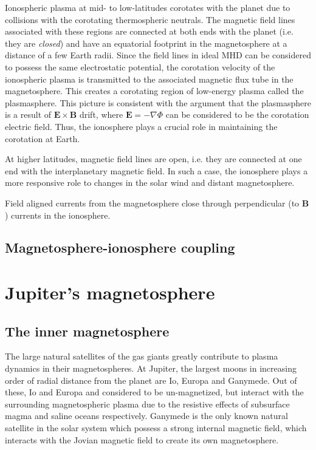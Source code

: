 Ionospheric plasma at mid- to low-latitudes corotates with the planet due to collisions with the corotating thermospheric neutrals. The magnetic field lines associated with these regions are connected at both ends with the planet (i.e. they are \emph{closed}) and have an equatorial footprint in the magnetosphere at a distance of a few Earth radii. Since the field lines in ideal MHD can be considered to possess the same electrostatic potential, the corotation velocity of the ionospheric plasma is transmitted to the associated magnetic flux tube in the magnetosphere. This creates a corotating region of low-energy plasma called the plasmasphere. This picture is consistent with the argument that the plasmasphere is a result of $\mathbf{E}\times\mathbf{B}$ drift, where $\mathbf{E}=-\nabla \Phi$ can be considered to be the corotation electric field. Thus, the ionosphere plays a crucial role in maintaining the corotation at Earth. 

At higher latitudes, magnetic field lines are open, i.e. they are connected at one end with the interplanetary magnetic field. In such a case, the ionosphere plays a more responsive role to changes in the solar wind and distant magnetosphere. 

Field aligned currents from the magnetosphere close through perpendicular (to $\mathbf{B}$) currents in the ionosphere. 






\subsection{Magnetosphere-ionosphere coupling}


\section{Jupiter's magnetosphere}


\subsection{The inner magnetosphere}
The large natural satellites of the gas giants greatly contribute to plasma dynamics in their magnetospheres. At Jupiter, the largest moons in increasing order of radial distance from the planet are Io, Europa and Ganymede. Out of these, Io and Europa and considered to be un-magnetized, but interact with the surrounding magnetospheric plasma due to the resistive effects of subsurface magma and saline oceans respectively. Ganymede is the only known natural satellite in the solar system which possess a strong internal magnetic field, which interacts with the Jovian magnetic field to create its own magnetosphere. 

